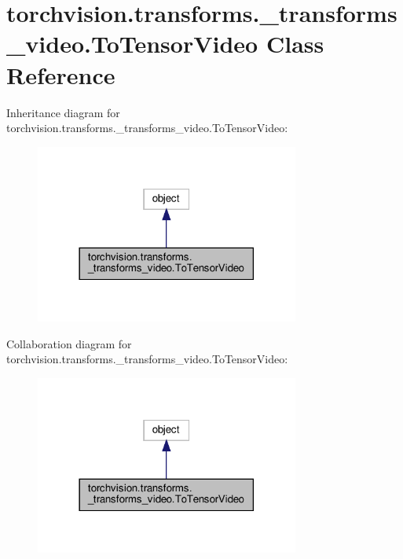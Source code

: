 \hypertarget{classtorchvision_1_1transforms_1_1__transforms__video_1_1ToTensorVideo}{}\section{torchvision.\+transforms.\+\_\+transforms\+\_\+video.\+To\+Tensor\+Video Class Reference}
\label{classtorchvision_1_1transforms_1_1__transforms__video_1_1ToTensorVideo}


Inheritance diagram for torchvision.\+transforms.\+\_\+transforms\+\_\+video.\+To\+Tensor\+Video\+:
\nopagebreak
\begin{figure}[H]
\begin{center}
\leavevmode
\includegraphics[width=246pt]{classtorchvision_1_1transforms_1_1__transforms__video_1_1ToTensorVideo__inherit__graph}
\end{center}
\end{figure}


Collaboration diagram for torchvision.\+transforms.\+\_\+transforms\+\_\+video.\+To\+Tensor\+Video\+:
\nopagebreak
\begin{figure}[H]
\begin{center}
\leavevmode
\includegraphics[width=246pt]{classtorchvision_1_1transforms_1_1__transforms__video_1_1ToTensorVideo__coll__graph}
\end{center}
\end{figure}
